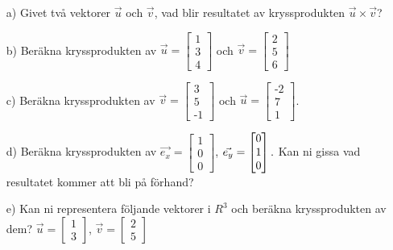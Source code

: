 \begin{itemize}
	\item[a) ] Givet två vektorer $\vec{u}$ och $\vec{v}$, vad blir resultatet av kryssprodukten $\vec{u}\times\vec{v}$?
	\item[b) ] Beräkna kryssprodukten av $\vec{u} = \begin{bmatrix} 1 \\ 3 \\ 4\end{bmatrix}$ och $\vec{v} = \begin{bmatrix} 2 \\ 5 \\ 6\end{bmatrix}$
	\item[c) ] Beräkna kryssprodukten av $\vec{v} = \begin{bmatrix} 3 \\ 5 \\ \text{-}1 \end{bmatrix}$ och $\vec{u} = \begin{bmatrix} \text{-}2 \\ 7 \\ 1 \end{bmatrix}$. 
	\item[d) ] Beräkna kryssprodukten av $\vec{e_x} = \begin{bmatrix} 1 \\ 0 \\ 0 \end{bmatrix}$, $\vec{e_y} = \begin{bmatrix} 0 \\ 1 \\ 0 \end{bmatrix}.\\ \\ $ Kan ni gissa vad resultatet kommer att bli på förhand?
	\item[e) ] Kan ni representera följande vektorer i $R^3$ och beräkna kryssprodukten av dem? $\vec{u} = \begin{bmatrix} 1 \\ 3 \end{bmatrix}$, $\vec{v} = \begin{bmatrix} 2 \\ 5 \end{bmatrix}$
\end{itemize}